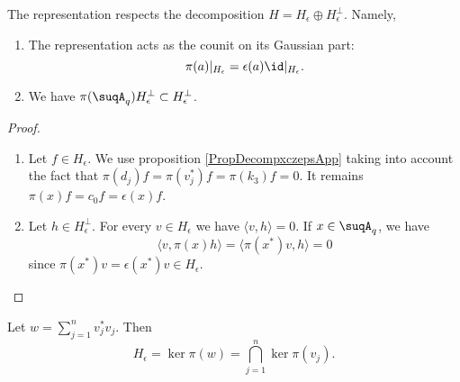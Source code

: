 \begin{lemma}       \label{LempiepsHepsUni}
    The representation respects the decomposition \(H=H_{\epsilon}\oplus H_{\epsilon}^{\perp}\). Namely,
    \begin{enumerate}
        \item
            The representation acts as the counit on its Gaussian part:
            \begin{equation}
                \pi(a)|_{H_{\epsilon}}=\epsilon(a)\id|_{H_{\epsilon}}.
            \end{equation}
        \item
            We have \(\pi(\suqA_q)H_{\epsilon}^{\perp}\subset H_{\epsilon}^{\perp}\).
    \end{enumerate}
\end{lemma}

\begin{proof}
    \begin{enumerate}
        \item
            Let $f\in H_{\epsilon}$. We use proposition \ref{PropDecompxczepsApp} taking into account the fact that $\pi(d_j)f=\pi(v_j^*)f=\pi(k_3)f=0$. It remains $\pi(x)f=c_0f=\epsilon(x)f$.
        \item
            Let \(h\in H_{\epsilon}^{\perp}\). For every \(v\in H_{\epsilon}\) we have \(\langle v, h\rangle =0\). If \(x\in\suqA_q\), we have
            \begin{equation}
                \langle v, \pi(x)h\rangle =\langle \pi(x^*)v, h\rangle =0
            \end{equation}
            since \(\pi(x^*)v=\epsilon(x^*)v\in H_{\epsilon}\).
    \end{enumerate}
\end{proof}

\begin{proposition}
    Let $w=\sum_{j=1}^nv_j^*v_j$. Then
    \begin{equation}
        H_{\epsilon}=\ker\pi(w)=\bigcap_{j=1}^n\ker\pi(v_j).
    \end{equation}
\end{proposition}

